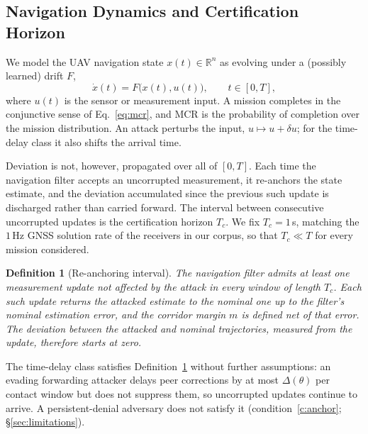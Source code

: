 \documentclass[conference,letterpaper,10pt]{IEEEtran}   %
\newcommand{\Real}{\mathbb{R}}
\newtheorem{definition}{Definition}
\begin{document}
\subsection{Navigation Dynamics and Certification Horizon}
We model the UAV navigation state $x(t)\in\Real^n$ as evolving under a (possibly
learned) drift $F$,
\begin{equation}
\label{eq:ode}
\dot{x}(t) = F\big(x(t), u(t)\big), \qquad t\in[0,T],
\end{equation}
where $u(t)$ is the sensor or measurement input. A mission completes in the
conjunctive sense of Eq.~\eqref{eq:mcr}, and MCR is the probability of
completion over the mission distribution. An attack perturbs the input,
$u\mapsto u+\delta u$; for the time-delay class it also shifts the arrival time.

Deviation is not, however, propagated over all of $[0,T]$. Each time the
navigation filter accepts an uncorrupted measurement, it re-anchors the state
estimate, and the deviation accumulated since the previous such update is
discharged rather than carried forward. The interval between consecutive
uncorrupted updates is the certification horizon $T_c$. We fix $T_c=1$\,s,
matching the $1$\,Hz GNSS solution rate of the receivers in our corpus, so that
$T_c\ll T$ for every mission considered.

\begin{definition}[Re-anchoring interval]
\label{def:reanchor}
The navigation filter admits at least one measurement update not affected by the
attack in every window of length $T_c$. Each such update returns the attacked
estimate to the nominal one up to the filter's nominal estimation error, and the
corridor margin $m$ is defined net of that error. The deviation between the
attacked and nominal trajectories, measured from the update, therefore starts
at zero.
\end{definition}

The time-delay class satisfies Definition~\ref{def:reanchor} without further
assumptions: an evading forwarding attacker delays peer corrections by at most
$\Delta(\theta)$ per contact window but does not suppress them, so uncorrupted
updates continue to arrive. A persistent-denial adversary does not satisfy it
(condition~\ref{c:anchor}; \S\ref{sec:limitations}).
\end{document}

